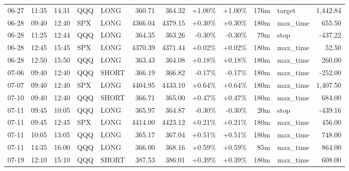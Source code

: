 \documentclass[11pt,a4paper,twoside]{article}
\begin{document}
\begin{center}
\begin{longtable}{>{\color{txtmain}}l l l l l r r r r r >{\color{txtmain}}l r}
06-27 & 11:35 & 14:31 & QQQ & LONG & 360.71 & 364.32 & \textcolor{wingreen}{+1.00\%} & \textcolor{wingreen}{+1.00\%} & 176m & target & \textcolor{wingreen}{1,442.84} \\
06-28 & 09:40 & 12:40 & SPX & LONG & 4366.04 & 4379.15 & \textcolor{wingreen}{+0.30\%} & \textcolor{wingreen}{+0.30\%} & 180m & max\_time & \textcolor{wingreen}{655.50} \\
06-28 & 11:25 & 12:44 & QQQ & LONG & 364.35 & 363.26 & \textcolor{lossred}{-0.30\%} & \textcolor{lossred}{-0.30\%} & 79m & stop & \textcolor{lossred}{-437.22} \\
06-28 & 12:45 & 15:45 & SPX & LONG & 4370.39 & 4371.44 & \textcolor{wingreen}{+0.02\%} & \textcolor{wingreen}{+0.02\%} & 180m & max\_time & \textcolor{wingreen}{52.50} \\
06-28 & 12:50 & 15:50 & QQQ & LONG & 363.43 & 364.08 & \textcolor{wingreen}{+0.18\%} & \textcolor{wingreen}{+0.18\%} & 180m & max\_time & \textcolor{wingreen}{260.00} \\
07-06 & 09:40 & 12:40 & QQQ & SHORT & 366.19 & 366.82 & \textcolor{lossred}{-0.17\%} & \textcolor{lossred}{-0.17\%} & 180m & max\_time & \textcolor{lossred}{-252.00} \\
07-07 & 09:40 & 12:40 & SPX & LONG & 4404.95 & 4433.10 & \textcolor{wingreen}{+0.64\%} & \textcolor{wingreen}{+0.64\%} & 180m & max\_time & \textcolor{wingreen}{1,407.50} \\
07-10 & 09:40 & 12:40 & QQQ & SHORT & 366.71 & 365.00 & \textcolor{wingreen}{+0.47\%} & \textcolor{wingreen}{+0.47\%} & 180m & max\_time & \textcolor{wingreen}{684.00} \\
07-11 & 09:45 & 10:05 & QQQ & LONG & 365.97 & 364.87 & \textcolor{lossred}{-0.30\%} & \textcolor{lossred}{-0.30\%} & 20m & stop & \textcolor{lossred}{-439.16} \\
07-11 & 09:45 & 12:45 & SPX & LONG & 4414.00 & 4423.12 & \textcolor{wingreen}{+0.21\%} & \textcolor{wingreen}{+0.21\%} & 180m & max\_time & \textcolor{wingreen}{456.00} \\
07-11 & 10:05 & 13:05 & QQQ & LONG & 365.17 & 367.04 & \textcolor{wingreen}{+0.51\%} & \textcolor{wingreen}{+0.51\%} & 180m & max\_time & \textcolor{wingreen}{748.00} \\
07-11 & 14:35 & 16:00 & QQQ & LONG & 366.00 & 368.16 & \textcolor{wingreen}{+0.59\%} & \textcolor{wingreen}{+0.59\%} & 85m & max\_time & \textcolor{wingreen}{864.00} \\
07-19 & 12:10 & 15:10 & QQQ & SHORT & 387.53 & 386.01 & \textcolor{wingreen}{+0.39\%} & \textcolor{wingreen}{+0.39\%} & 180m & max\_time & \textcolor{wingreen}{608.00} \\

\end{longtable}
\end{center}
\end{document}
